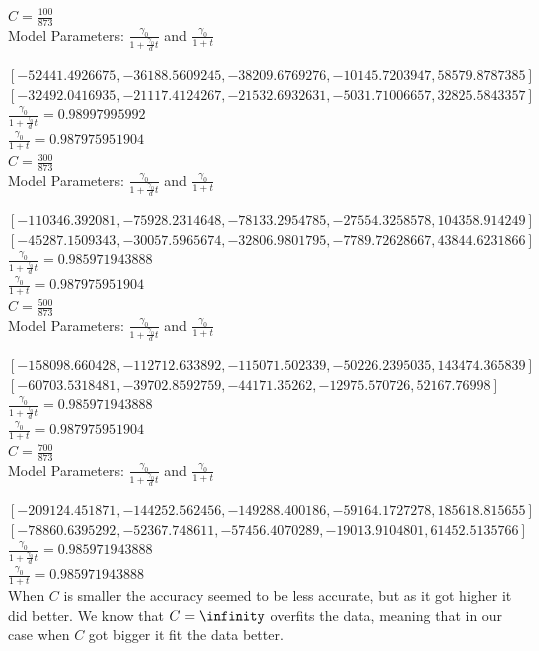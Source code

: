 \documentclass[12pt, fullpage,letterpaper]{article}
\begin{document}
\begin{enumerate}
\begin{enumerate}
$C = \frac{100}{873}$\\
Model Parameters: $\frac{\gamma_0}{1+\frac{\gamma_0}{d}t}$ and
$\frac{\gamma_0}{1+t}$

$[-52441.4926675, -36188.5609245, -38209.6769276, -10145.7203947, 58579.8787385]$\\
$[-32492.0416935, -21117.4124267, -21532.6932631, -5031.71006657, 32825.5843357]$\\

$\frac{\gamma_0}{1+\frac{\gamma_0}{d}t} = 0.98997995992$\\
$\frac{\gamma_0}{1+t} = 0.987975951904$\\

$C = \frac{300}{873}$\\
Model Parameters: $\frac{\gamma_0}{1+\frac{\gamma_0}{d}t}$ and
$\frac{\gamma_0}{1+t}$

$[-110346.392081, -75928.2314648, -78133.2954785, -27554.3258578, 104358.914249]$\\
$[-45287.1509343, -30057.5965674, -32806.9801795, -7789.72628667, 43844.6231866]$\\

$\frac{\gamma_0}{1+\frac{\gamma_0}{d}t} = 0.985971943888$\\
$\frac{\gamma_0}{1+t} = 0.987975951904$\\

$C = \frac{500}{873}$\\
Model Parameters: $\frac{\gamma_0}{1+\frac{\gamma_0}{d}t}$ and
$\frac{\gamma_0}{1+t}$

$[-158098.660428, -112712.633892, -115071.502339, -50226.2395035, 143474.365839]$\\
$[-60703.5318481, -39702.8592759, -44171.35262, -12975.570726, 52167.76998]$\\

$\frac{\gamma_0}{1+\frac{\gamma_0}{d}t} = 0.985971943888$\\
$\frac{\gamma_0}{1+t} = 0.987975951904$\\

$C = \frac{700}{873}$\\
Model Parameters: $\frac{\gamma_0}{1+\frac{\gamma_0}{d}t}$ and
$\frac{\gamma_0}{1+t}$

$[-209124.451871, -144252.562456, -149288.400186, -59164.1727278, 185618.815655]$\\
$[-78860.6395292, -52367.748611, -57456.4070289, -19013.9104801, 61452.5135766]$\\

$\frac{\gamma_0}{1+\frac{\gamma_0}{d}t} = 0.985971943888$\\
$\frac{\gamma_0}{1+t} = 0.985971943888$\\


When $C$ is smaller the accuracy seemed to be less accurate, but as it got higher it did better.
We know that $C = \infinity$ overfits the data, meaning that in our case when $C$ got bigger it fit the data better.

\end{enumerate}
\end{enumerate}
\end{document}
